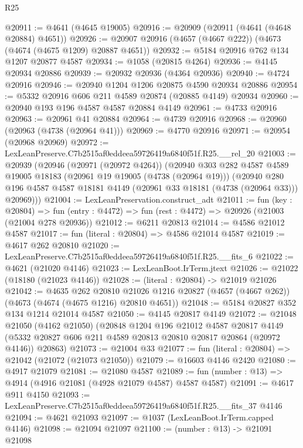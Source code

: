 \begin{lexlean}{R25}
\begin{coremodule}
@20911 := @4641 (@4645 @19005)
@20916 := @20909 (@20911 (@4641 (@4648 @20884) @4651))
@20926 := @20907 @20916 (@4657 (@4667 @222)) (@4673 (@4674 (@4675 @1209) @20887 @4651))
@20932 := @5184 @20916 @762 @134 @1207 @20877 @4587
@20934 := @1058 (@20815 @4264)
@20936 := @4145 @20934 @20886
@20939 := @20932 @20936 (@4364 @20936)
@20940 := @4724 @20916
@20946 := @20940 @1204 @1206 @20875 @4590 @20934 @20886
@20954 := @5332 @20916 @606 @211 @4589 @20874 (@20885 @4149) @20934
@20960 := @20940 @193 @196 @4587 @4587 @20884 @4149
@20961 := @4733 @20916
@20963 := @20961 @41 @20884
@20964 := @4739 @20916
@20968 := @20960 (@20963 (@4738 (@20964 @41)))
@20969 := @4770 @20916
@20971 := @20954 (@20968 @20969)
@20972 := LexLeanPreserve.C7b2515af0eddeea59726419a6840f51f.R25.__rel_20
@21003 := @20939
    (@20946
      (@20971 (@20972 @4264))
      (@20940
        @303
        @282
        @4587
        @4589
        @19005
        @18183
        (@20961 @19 @19005 (@4738 (@20964 @19)))
        (@20940
          @280
          @196
          @4587
          @4587
          @18181
          @4149
          (@20961 @33 @18181 (@4738 (@20964 @33)))
          @20969)))
@21004 := LexLeanPreservation.construct_adt
@21011 := fun (key : @20804) =>
  fun (entry : @4472) => fun (rest : @4472) => @20926 (@21003 (@21004 @278 @20936))
@21012 := @6211 @20813
@21014 := @4586 @21012 @4587
@21017 := fun (literal : @20804) => @4586 @21014 @4587
@21019 := @4617 @262 @20810
@21020 := LexLeanPreserve.C7b2515af0eddeea59726419a6840f51f.R25.__fits_6
@21022 := @4621 (@21020 @4146)
@21023 := LexLeanBoot.IrTerm.jtext
@21026 := @21022 (@18180 (@21023 @4146))
@21028 := (literal : @20804) -> @21019 @21026
@21042 := @4635
    @262
    @20810
    @21026
    @1216
    @20827
    (@4657 (@4667 @262))
    (@4673 (@4674 (@4675 @1216) @20810 @4651))
@21048 := @5184 @20827 @352 @134 @1214 @21014 @4587
@21050 := @4145 @20817 @4149
@21072 := @21048
    @21050
    (@4162 @21050)
    (@20848
      @1204
      @196
      @21012
      @4587
      @20817
      @4149
      (@5332 @20827 @606 @211 @4589 @20813 @20810 @20817 @20864 (@20972 @4146))
      @20863)
@21073 := @21004 @33
@21077 := fun (literal : @20804) => @21042 (@21072 (@21073 @21050))
@21079 := @16603 @4146 @2420
@21080 := @4917 @21079
@21081 := @21080 @4587
@21089 := fun (number : @13) => @4914 (@4916 @21081 (@4928 @21079 @4587) @4587 @4587)
@21091 := @4617 @911 @4150
@21093 := LexLeanPreserve.C7b2515af0eddeea59726419a6840f51f.R25.__fits_37 @4146
@21094 := @4621 @21093
@21097 := @1037 (LexLeanBoot.IrTerm.capped @4146)
@21098 := @21094 @21097
@21100 := (number : @13) -> @21091 @21098

\end{coremodule}
\end{lexlean}
